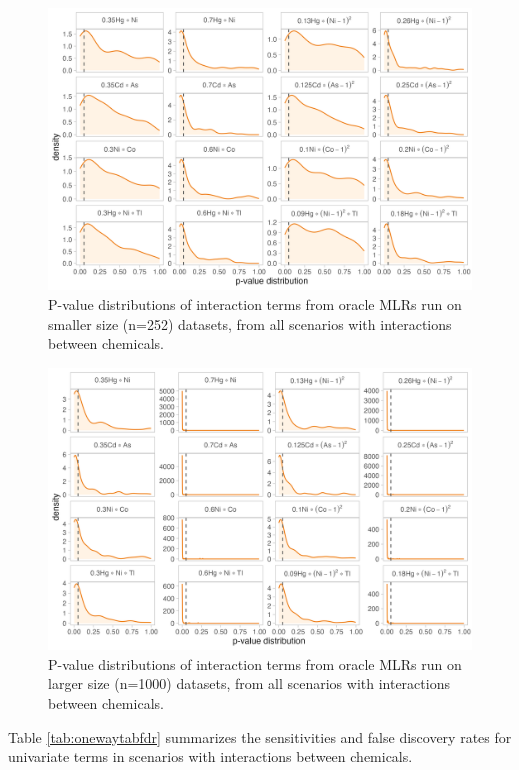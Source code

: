 \documentclass[12pt, twoside]{amherstthesis}
\begin{document}
\begin{figure}

{\centering \includegraphics[width=0.8\linewidth]{figures/ch4_osm_biv_pval} 

}

\caption{P-value distributions of interaction terms from oracle MLRs run on smaller size (n=252) datasets, from all scenarios with interactions between chemicals.}\label{fig:osmbivp}
\end{figure}
\begin{figure}

{\centering \includegraphics[width=0.8\linewidth]{figures/ch4_olg_biv_pval} 

}

\caption{P-value distributions of interaction terms from oracle MLRs run on larger size (n=1000) datasets, from all scenarios with interactions between chemicals.}\label{fig:olgbivp}
\end{figure}
Table \ref{tab:onewaytabfdr} summarizes the sensitivities and false discovery rates for univariate terms in scenarios with interactions between chemicals.
\end{document}
